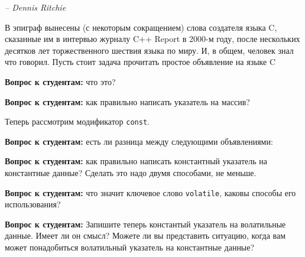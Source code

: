 \documentclass[a4paper,12pt,oneside]{article}
\newif\ifanswers
\begin{document}
\hfill\textit{-- Dennis Ritchie}

В эпиграф вынесены (с некоторым сокращением) слова создателя языка C, сказанные им в интервью журналу C++ Report в 2000-м году, после нескольких десятков лет торжественного шествия языка по миру. И, в общем, человек знал что говорил. Пусть стоит задача прочитать простое объявление на языке C



\textbf{Вопрос к студентам:} что это? 

\ifanswers
Ответ: да, это массив указателей\index{Array of pointers}. 
\fi

\textbf{Вопрос к студентам:} как правильно написать указатель на массив?

\ifanswers
Ответ\index{Pointer to array}:


\fi

Теперь рассмотрим модификатор \lstinline!const!. 

\textbf{Вопрос к студентам:} есть ли разница между следующими объявлениями:



\ifanswers
Ответ: между первым и вторым нет, между вторым и третьим очень существенная разница. Во втором случае (как и в первом) речь идёт о \textbf{не константном} указателе на константные данные. В третьем случае речь идёт о \textbf{константном} указателе на не константные данные. Объявляя константу нельзя оставить её неинициализированной, поэтому инициализатор выделяет строчку, где объявлен константный указатель. В то же время, указатель на константные данные сам может быть неконстантным и инициализации не требует (хотя она возможна).
\fi

\textbf{Вопрос к студентам:} как правильно написать константный указатель на константные данные? Сделать это надо двумя способами, не меньше.

\textbf{Вопрос к студентам:} что значит ключевое слово \lstinline!volatile!, каковы способы его использования?

\textbf{Вопрос к студентам:} Запишите теперь константый указатель на волатильные данные. Имеет ли он смысл? Можете ли вы представить ситуацию, когда вам может понадобиться волатильный указатель на константные данные?

\ifanswers
Ответы на первые два вопроса очевидны, но ответ на третий может быть несколько экзотичен: если этот указатель \lstinline!register! переменная, которая определяет область памяти откуда идёт чтение и которая при этом соответсвует не настоящему регистру а некоему устройству, притворяющемуся регистром, но допускающему смену состояний, то конструкция обретает смысл.
\fi
\end{document}
